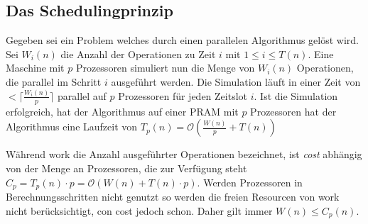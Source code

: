 \subsection{Das Schedulingprinzip}
Gegeben sei ein Problem welches durch einen parallelen Algorithmus gelöst wird.
Sei $W_i(n)$ die Anzahl der Operationen zu Zeit $i$ mit $1 \leq i \leq T(n)$.
Eine Maschine mit $p$ Prozessoren simuliert nun die Menge von $W_i(n)$
Operationen, die parallel im Schritt $i$ ausgeführt werden.
Die Simulation läuft in einer Zeit von $< \lceil \frac{W_i(n)}{p} \rceil$
parallel auf $p$ Prozessoren für jeden Zeitslot $i$.
Ist die Simulation erfolgreich, hat der Algorithmus auf einer PRAM mit $p$
Prozessoren hat der Algorithmus eine Laufzeit von
$T_p(n) = \mathcal{O} \left( \frac{W(n)}{p} + T(n) \right)$
\cite[S.28]{jaja}

Während work die Anzahl ausgeführter Operationen bezeichnet, ist \emph{cost}
abhängig von der Menge an Prozessoren, die zur Verfügung steht
$C_p = T_p(n) \cdot p = \mathcal{O} (W(n) + T(n) \cdot p)$.
Werden Prozessoren in Berechnungsschritten nicht genutzt so werden die freien
Resourcen von work nicht berücksichtigt, con cost jedoch schon.
Daher gilt immer $W(n) \leq C_p(n)$.
\cite[S.31]{jaja}
